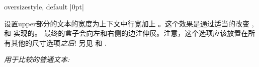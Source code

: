 \begin{docTcbKey}{oversize}{}{style, default |0pt|}

设置upper部分的文本的宽度为上下文中行宽加上 。这个效果是通过适当的改变  , 和  实现的。
最终的盒子会向左和右侧的边注伸展。注意，这个选项应该放置在所有其他的尺寸选项\emph{之后}!
另见  和 .
\begin{dispListing}

\textit{用于比较的普通文本:}\\
\lipsum[2]

\begin{tcolorbox}[oversize,title=Oversized box]
\lipsum[2]
\end{tcolorbox}

\begin{tcolorbox}[title=Normal box]
\lipsum[2]
\end{tcolorbox}
\end{dispListing}
\end{docTcbKey}

{\tcbusetemp}




  
